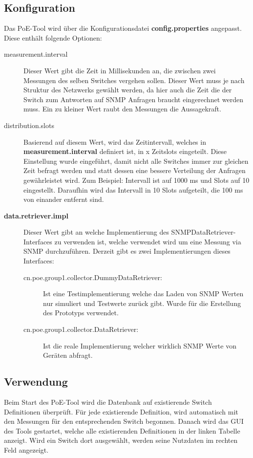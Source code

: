 \subsection{Konfiguration}

Das PoE-Tool wird über die Konfigurationsdatei \textbf{config.properties} angepasst. Diese enthält folgende Optionen:

\begin{description}
  \item [measurement.interval] Dieser Wert gibt die Zeit in Millisekunden an, die zwischen zwei Messungen des selben Switches vergehen sollen. Dieser Wert muss je nach Struktur des Netzwerks gewählt werden, da hier auch die Zeit die der Switch zum Antworten auf SNMP Anfragen braucht eingerechnet werden muss. Ein zu kleiner Wert raubt den Messungen die Aussagekraft.
  \item [distribution.slots] Basierend auf diesem Wert, wird das Zeitintervall, welches in \textbf{measurement.interval} definiert ist, in x Zeitslots eingeteilt. Diese Einstellung wurde eingeführt, damit nicht alle Switches immer zur gleichen Zeit befragt werden und statt dessen eine bessere Verteilung der Anfragen gewährleistet wird. Zum Beispiel: Intervall ist auf 1000 ms und Slots auf 10 eingestellt. Daraufhin wird das Intervall in 10 Slots aufgeteilt, die 100 ms von einander entfernt sind.
  \item [\textbf{data.retriever.impl}] Dieser Wert gibt an welche Implementierung des SNMP\-Data\-Retriever-Interfaces zu verwenden ist, welche verwendet wird um eine Messung via SNMP durchzuführen. Derzeit gibt es zwei Implementierungen dieses Interfaces:
  \begin{description}
   \item[cn.poe.group1.collector.DummyDataRetriever:] Ist eine Testimplementierung welche das Laden von SNMP Werten nur simuliert und Testwerte zurück gibt. Wurde für die Erstellung des Prototyps verwendet.
   \item[cn.poe.group1.collector.DataRetriever:] Ist die reale Implementierung welcher wirklich SNMP Werte von Geräten abfragt.
  \end{description}
\end{description}

\subsection{Verwendung}
Beim Start des PoE-Tool wird die Datenbank auf existierende Switch Definitionen überprüft. Für jede existierende Definition, wird automatisch mit den Messungen für den entsprechenden Switch begonnen. Danach wird das GUI des Tools gestartet, welche alle existierenden Definitionen in der linken Tabelle anzeigt. Wird ein Switch dort ausgewählt, werden seine Nutzdaten im rechten Feld angezeigt.

